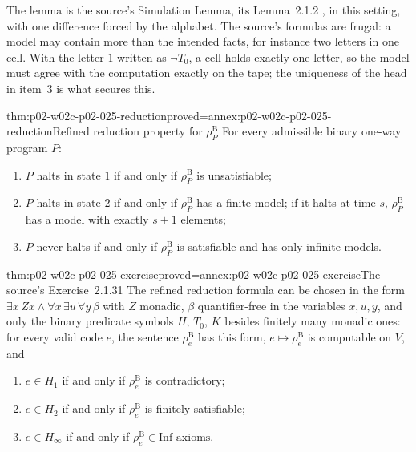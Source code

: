The lemma is the source's Simulation Lemma, its Lemma~2.1.2
\cite[Sect.~2.1.1, p.~20]{BorgerGradelGurevich1997}, in this setting, with one difference forced by the alphabet.  The source's formulas are
frugal: a model may contain more than the intended facts, for instance two
letters in one cell.  With the letter \(1\) written as \(\neg T_0\), a cell
holds exactly one letter, so the model must agree with the computation exactly
on the tape; the uniqueness of the head in item~3 is what secures this.

\begin{hbtheorem}{thm:p02-w02c-p02-025-reduction}{proved=annex:p02-w02c-p02-025-reduction}{Refined reduction property for \(\rho^{\mathrm B}_P\)}
For every admissible binary one-way program \(P\):
\begin{enumerate}
\item \(P\) halts in state \(1\) if and only if \(\rho^{\mathrm B}_P\) is
      unsatisfiable;
\item \(P\) halts in state \(2\) if and only if \(\rho^{\mathrm B}_P\) has a
      finite model; if it halts at time \(s\), \(\rho^{\mathrm B}_P\) has a model
      with exactly \(s+1\) elements;
\item \(P\) never halts if and only if \(\rho^{\mathrm B}_P\) is satisfiable
      and has only infinite models.
\end{enumerate}
\end{hbtheorem}

\begin{hbtheorem}{thm:p02-w02c-p02-025-exercise}{proved=annex:p02-w02c-p02-025-exercise}{The source's Exercise~2.1.31}
The refined reduction formula can be chosen in the form
\(\exists x\,Zx\land\forall x\,\exists u\,\forall y\,\beta\) with \(Z\)
monadic, \(\beta\) quantifier-free in the variables \(x,u,y\), and only the
binary predicate symbols \(H\), \(T_0\), \(K\) besides finitely many monadic
ones: for every valid code \(e\), the sentence \(\rho^{\mathrm B}_e\) has this
form, \(e\mapsto\rho^{\mathrm B}_e\) is computable on \(V\), and
\begin{enumerate}
\item \(e\in H_1\) if and only if \(\rho^{\mathrm B}_e\) is contradictory;
\item \(e\in H_2\) if and only if \(\rho^{\mathrm B}_e\) is finitely
      satisfiable;
\item \(e\in H_\infty\) if and only if
      \(\rho^{\mathrm B}_e\in\mathrm{Inf\text{-}axioms}\).
\end{enumerate}
\end{hbtheorem}

